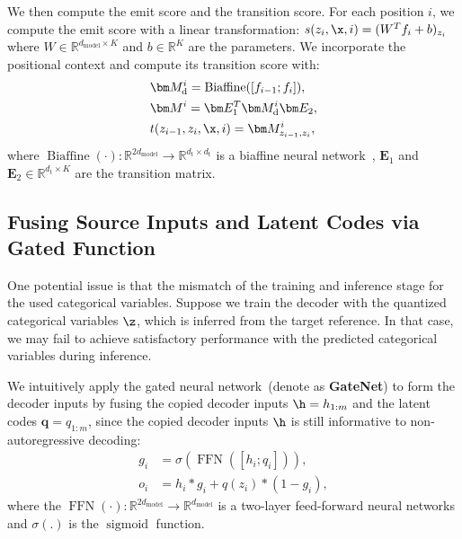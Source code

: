 We then compute the emit score and the transition score. 
For each position $i$, we compute the emit score with a linear transformation: $s(z_i,\x,i)=(W^{T}f_{i}+b)_{z_i}$ where $W \in \mathbb{R}^{d_\text{model}\times K}$ and $b \in \mathbb{R}^{K}$ are the parameters. 
We incorporate the positional context and compute its transition score with:
\begin{equation}
    \begin{split}
        &\bm M_\text{d}^{i} = \operatorname{Biaffine}([f_{i-1};f_i]), \\
        &\bm M^{i}  = \bm E_{1}^{T}\bm M_\text{d}^{i}\bm E_2,\\
        &t(z_{i-1},z_i,\x,i) =\bm M_{z_{i-1},z_{i}}^{i},
    \end{split}
\end{equation}
where $\operatorname{Biaffine}(\cdot):\mathbb{R}^{2d_\text{model}} \to \mathbb{R}^{d_\text{t}\times d_\text{t}} $ is a biaffine neural network~\cite{biaffine}, $\bm E_1$ and $\bm E_2\in\mathbb{R}^{d_\text{t}\times K}$ are the transition matrix.

\subsection{Fusing Source Inputs and Latent Codes via Gated Function}\label{ss:input}
One potential issue is that the mismatch of the training and inference stage for the used categorical variables. 
Suppose we train the decoder with the quantized categorical variables $\z$, which is inferred from the target reference. 
In that case, we may fail to achieve satisfactory performance with the predicted categorical variables during inference.

We intuitively apply the gated neural network~(denote as \textbf{GateNet}) to form the decoder inputs by fusing the copied decoder inputs $\h=h_{1:m}$ and the latent codes $\bm q=q_{1:m}$, since the copied decoder inputs $\h$ is still informative to non-autoregressive decoding:
\begin{equation}
\begin{split}
    g_i &= \sigma(\operatorname{FFN}([h_i;q_i])), \\
     o_i &= h_i*g_i + q(z_i)*(1-g_i), 
\end{split}
\end{equation}
where the $\operatorname{FFN}(\cdot): \mathbb{R}^{2d_\text{model}}\to \mathbb{R}^{d_\text{model}}$ is a two-layer feed-forward neural networks and $\sigma(.)$ is the $\operatorname{sigmoid}$ function.
